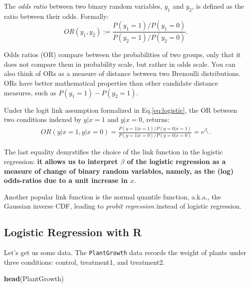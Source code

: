 \documentclass[]{book}
\newenvironment{Shaded}{\begin{snugshade}}{\end{snugshade}}
\newcommand{\KeywordTok}[1]{\textcolor[rgb]{0.13,0.29,0.53}{\textbf{#1}}}
\newcommand{\NormalTok}[1]{#1}
\theoremstyle{definition}
\theoremstyle{definition}
\theoremstyle{definition}
\theoremstyle{remark}
\let\BeginKnitrBlock\begin \let\EndKnitrBlock\end
\begin{document}
\BeginKnitrBlock{definition}[Odds Ratio]
\protect\hypertarget{def:unnamed-chunk-183}{}{\label{def:unnamed-chunk-183} {} }The \emph{odds ratio} between two binary random variables, \(y_1\) and \(y_2\), is defined as the ratio between their odds.
Formally:
\[OR(y_1,y_2):=\frac{P(y_1=1)/P(y_1=0)}{P(y_2=1)/P(y_2=0)}.\]
\EndKnitrBlock{definition}

Odds ratios (OR) compare between the probabilities of two groups, only that it does not compare them in probability scale, but rather in odds scale.
You can also think of ORs as a measure of distance between two Brenoulli distributions.
ORs have better mathematical properties than other candidate distance measures, such as \(P(y_1=1)-P(y_2=1)\).

Under the logit link assumption formalized in Eq.\eqref{eq:logistic}, the OR between two conditions indexed by \(y|x=1\) and \(y|x=0\), returns:
\begin{align}
   OR(y|x=1,y|x=0) 
   = \frac{P(y=1|x=1)/P(y=0|x=1)}{P(y=1|x=0)/P(y=0|x=0)} 
   = e^{\beta_1}.  
\end{align}

The last equality demystifies the choice of the link function in the logistic regression: \textbf{it allows us to interpret \(\beta\) of the logistic regression as a measure of change of binary random variables, namely, as the (log) odds-ratios due to a unit increase in \(x\)}.

\BeginKnitrBlock{remark}
{}Another popular link function is the normal quantile function, a.k.a., the Gaussian inverse CDF, leading to \emph{probit regression} instead of logistic regression.
\EndKnitrBlock{remark}

\hypertarget{logistic-regression-with-r}{%
\subsection{Logistic Regression with R}\label{logistic-regression-with-r}}

Let's get us some data.
The \texttt{PlantGrowth} data records the weight of plants under three conditions: control, treatment1, and treatment2.

\begin{Shaded}
\begin{Highlighting}[]
\KeywordTok{head}\NormalTok{(PlantGrowth)}
\end{Highlighting}
\end{Shaded}
\end{document}
